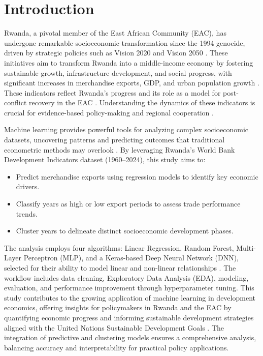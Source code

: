\documentclass[12pt]{article}
\begin{document}
	\section{Introduction}
	Rwanda, a pivotal member of the East African Community (EAC), has undergone remarkable socioeconomic transformation since the 1994 genocide, driven by strategic policies such as Vision 2020 and Vision 2050 \citep{rwanda_vision}. These initiatives aim to transform Rwanda into a middle-income economy by fostering sustainable growth, infrastructure development, and social progress, with significant increases in merchandise exports, GDP, and urban population growth \citep{wdi, eac}. These indicators reflect Rwanda's progress and its role as a model for post-conflict recovery in the EAC \citep{un_sdg}. Understanding the dynamics of these indicators is crucial for evidence-based policy-making and regional cooperation \citep{eac}.
	
	Machine learning provides powerful tools for analyzing complex socioeconomic datasets, uncovering patterns and predicting outcomes that traditional econometric methods may overlook \citep{geron, hastie}. By leveraging Rwanda's World Bank Development Indicators dataset (1960–2024), this study aims to:
	\begin{itemize}
		\item Predict merchandise exports using regression models to identify key economic drivers.
		\item Classify years as high or low export periods to assess trade performance trends.
		\item Cluster years to delineate distinct socioeconomic development phases.
	\end{itemize}
	
	The analysis employs four algorithms: Linear Regression, Random Forest, Multi-Layer Perceptron (MLP), and a Keras-based Deep Neural Network (DNN), selected for their ability to model linear and non-linear relationships \citep{scikit-learn, tensorflow, breiman, goodfellow}. The workflow includes data cleaning, Exploratory Data Analysis (EDA), modeling, evaluation, and performance improvement through hyperparameter tuning. This study contributes to the growing application of machine learning in development economics, offering insights for policymakers in Rwanda and the EAC by quantifying economic progress and informing sustainable development strategies aligned with the United Nations Sustainable Development Goals \citep{un_sdg}. The integration of predictive and clustering models ensures a comprehensive analysis, balancing accuracy and interpretability for practical policy applications.
	
\end{document}

